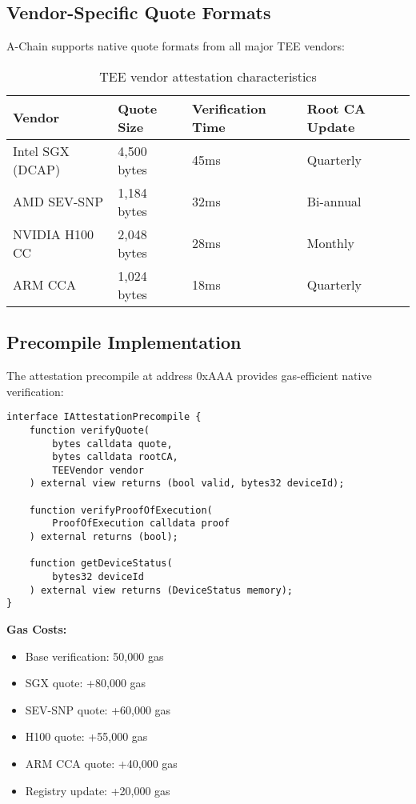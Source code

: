 \documentclass[11pt,a4paper]{article}
\begin{document}
\subsection{Vendor-Specific Quote Formats}

A-Chain supports native quote formats from all major TEE vendors:

\begin{table}[h]
\centering
\begin{tabular}{@{}llll@{}}
\toprule
\textbf{Vendor} & \textbf{Quote Size} & \textbf{Verification Time} & \textbf{Root CA Update} \\ \midrule
Intel SGX (DCAP) & 4,500 bytes & 45ms & Quarterly \\
AMD SEV-SNP & 1,184 bytes & 32ms & Bi-annual \\
NVIDIA H100 CC & 2,048 bytes & 28ms & Monthly \\
ARM CCA & 1,024 bytes & 18ms & Quarterly \\ \bottomrule
\end{tabular}
\caption{TEE vendor attestation characteristics}
\end{table}

\subsection{Precompile Implementation}

The attestation precompile at address 0xAAA provides gas-efficient native verification:

\begin{lstlisting}[language=Solidity, basicstyle=\small\ttfamily]
interface IAttestationPrecompile {
    function verifyQuote(
        bytes calldata quote,
        bytes calldata rootCA,
        TEEVendor vendor
    ) external view returns (bool valid, bytes32 deviceId);
    
    function verifyProofOfExecution(
        ProofOfExecution calldata proof
    ) external returns (bool);
    
    function getDeviceStatus(
        bytes32 deviceId
    ) external view returns (DeviceStatus memory);
}
\end{lstlisting}

\textbf{Gas Costs:}
\begin{itemize}
\item Base verification: 50,000 gas
\item SGX quote: +80,000 gas
\item SEV-SNP quote: +60,000 gas
\item H100 quote: +55,000 gas
\item ARM CCA quote: +40,000 gas
\item Registry update: +20,000 gas
\end{itemize}
\end{document}
